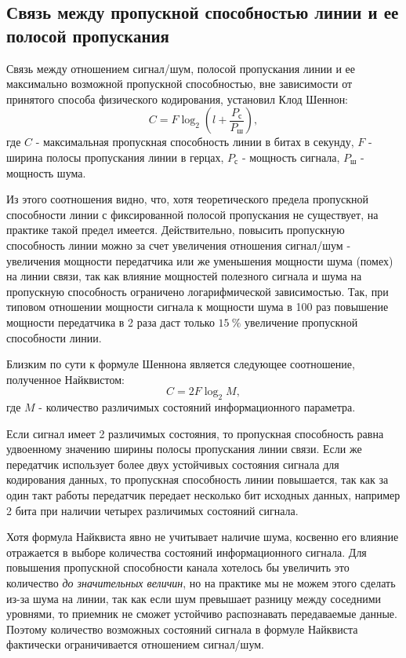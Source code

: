 \subsection{Связь между пропускной способностью линии и ее полосой пропускания}

Связь между отношением сигнал/шум, полосой пропускания линии и ее максимально возможной пропускной способностью, вне зависимости от принятого способа физического кодирования, установил Клод Шеннон:
\[
    C = F \log_2 \left(l + \frac{P_\text{с}}{P_\text{ш}}\right),
\]
где $C$ - максимальная пропускная способность линии в битах в секунду, $F$ - ширина полосы пропускания линии в герцах, $P_\text{с}$ - мощность сигнала, $P_\text{ш}$ - мощность шума.

Из этого соотношения видно, что, хотя теоретического предела пропускной способности линии с фиксированной полосой пропускания не существует, на практике такой предел имеется.
Действительно, повысить пропускную способность линии можно за счет увеличения отношения сигнал/шум - увеличения мощности передатчика или же уменьшения мощности шума (помех) на линии связи, так как влияние мощностей полезного сигнала и шума на пропускную способность ограничено логарифмической зависимостью.
Так, при типовом отношении мощности сигнала к мощности шума в 100 раз повышение мощности передатчика в 2 раза даст только $15~\%$ увеличение пропускной способности линии.

Близким по сути к формуле Шеннона является следующее соотношение, полученное Найквистом:
\[
    C = 2 F \log_2 M,
\]
где $M$ - количество различимых состояний информационного параметра.

Если сигнал имеет 2 различимых состояния, то пропускная способность равна удвоенному значению ширины полосы пропускания линии связи.
Если же передатчик использует более двух устойчивых состояния сигнала для кодирования данных, то пропускная способность линии повышается, так как за один такт работы передатчик передает несколько бит исходных данных, например 2 бита при наличии четырех различимых состояний сигнала.

Хотя формула Найквиста явно не учитывает наличие шума, косвенно его влияние отражается в выборе количества состояний информационного сигнала.
Для повышения пропускной способности канала хотелось бы увеличить это количество \emph{до значительных величин}, но на практике мы не можем этого сделать из-за шума на линии, так как если шум превышает разницу между соседними уровнями, то приемник не сможет устойчиво распознавать передаваемые данные.
Поэтому количество возможных состояний сигнала в формуле Найквиста фактически ограничивается отношением сигнал/шум.

